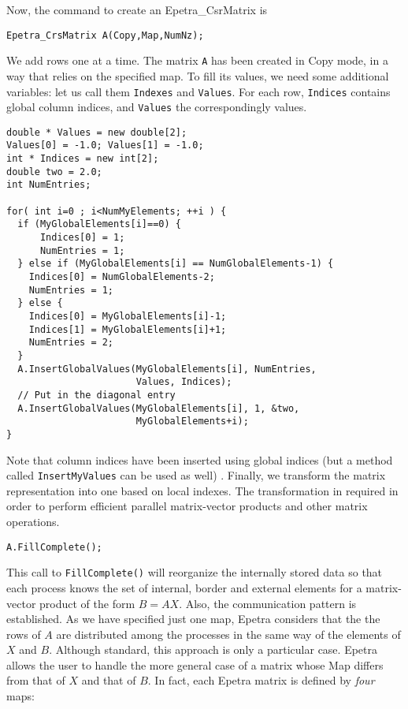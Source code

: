 Now, the command to create an Epetra\_CsrMatrix is
\begin{verbatim}
Epetra_CrsMatrix A(Copy,Map,NumNz);
\end{verbatim}
We add rows one at a time. The matrix \verb!A! has been created in Copy
mode, in a way that relies on the specified map. To fill its values, we
need some additional variables: let us call them \verb!Indexes! and
\verb!Values!. For each row, \verb!Indices! contains global column
indices, and \verb!Values! the correspondingly values.
\begin{verbatim}
double * Values = new double[2];
Values[0] = -1.0; Values[1] = -1.0;
int * Indices = new int[2];
double two = 2.0;
int NumEntries;

for( int i=0 ; i<NumMyElements; ++i ) {
  if (MyGlobalElements[i]==0) {
      Indices[0] = 1;
      NumEntries = 1;
  } else if (MyGlobalElements[i] == NumGlobalElements-1) {
    Indices[0] = NumGlobalElements-2;
    NumEntries = 1;
  } else {
    Indices[0] = MyGlobalElements[i]-1;
    Indices[1] = MyGlobalElements[i]+1;
    NumEntries = 2;
  }
  A.InsertGlobalValues(MyGlobalElements[i], NumEntries, 
                       Values, Indices);
  // Put in the diagonal entry
  A.InsertGlobalValues(MyGlobalElements[i], 1, &two, 
                       MyGlobalElements+i);
}
\end{verbatim}
Note that column indices have been inserted using global indices (but a
method called \verb!InsertMyValues! can be used as well) .  Finally, we
transform the matrix representation into one based on local indexes. The
transformation in required in order to perform efficient parallel
matrix-vector products and other matrix operations.
\begin{verbatim}
A.FillComplete();
\end{verbatim}
This call to \verb!FillComplete()! will reorganize the internally stored
data so that each process knows the set of internal, border and external
elements for a matrix-vector product of the form $B = AX$. Also, the
communication pattern is established. As we have specified just one map,
Epetra considers that the the rows of $A$ are distributed among the
processes in the same way of the elements of $X$ and $B$.  Although
standard, this approach is only a particular case.  Epetra allows the
user to handle the more general case of a matrix whose Map differs from
that of $X$ and that of $B$. In fact, each Epetra matrix is defined by
{\sl four} maps:
